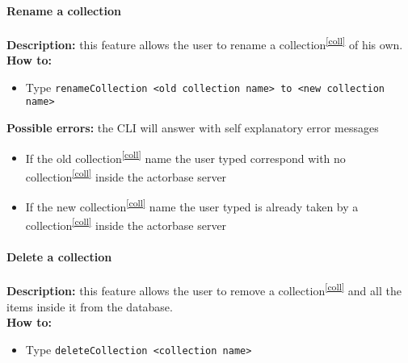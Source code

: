 \documentclass{scalatekids-article}
\begin{document}
\paragraph{Rename a collection}
\label{sec:renamecollection}
\textbf{Description:} this feature allows the user to rename a
collection\textsuperscript{\ref{coll}} of his own.\\
\textbf{How to:}
\begin{itemize}
\item Type \texttt{renameCollection <old collection name> to <new collection name>}
\end{itemize}
\textbf{Possible errors:} the CLI will answer with self explanatory error messages
\begin{itemize}
\item If the old collection\textsuperscript{\ref{coll}} name the user typed correspond with no collection\textsuperscript{\ref{coll}} inside the actorbase server
\item If the new collection\textsuperscript{\ref{coll}} name the user typed is already taken by a collection\textsuperscript{\ref{coll}} inside the actorbase server
\end{itemize}

\paragraph{Delete a collection}
\label{sec:deletecollection}
\textbf{Description:} this feature allows the user to remove a collection\textsuperscript{\ref{coll}} and all the items inside it from the database.\\
\textbf{How to:}
\begin{itemize}
\item Type \texttt{deleteCollection <collection name>}
\end{itemize}
\end{document}
